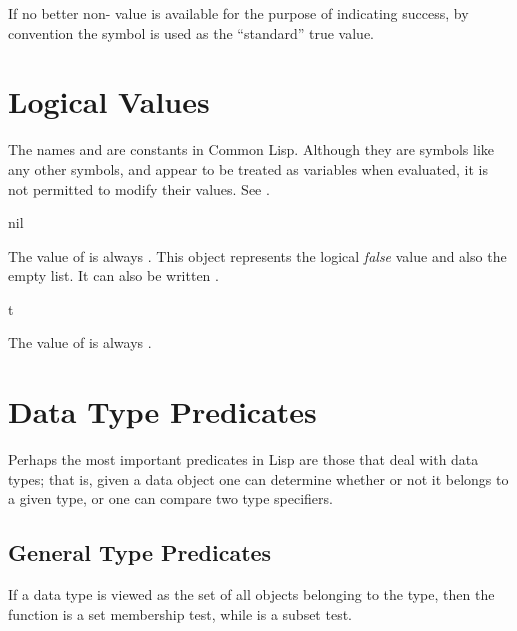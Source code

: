 If no better non-{\nil} value is available for the purpose of indicating
success, by convention the symbol  is used as the ``standard''
true value.

\section{Logical Values}

The names  and  are constants in Common Lisp.  Although they
are symbols like any other symbols, and appear to be treated
as variables when evaluated, it is not permitted to modify their
values.  See .

\begin{defun}[Constant]
nil

The value of {\nil} is always {\nil}.  This object represents the logical
\emph{false} value and also the empty list.  It can also be written \cd{()}.
\end{defun}

\begin{defun}[Constant]
t

The value of  is always .
\end{defun}

\section{Data Type Predicates}

Perhaps the most important predicates in Lisp are those that deal
with data types;  that is, given a data object one can determine whether
or not it belongs to a given type, or one can compare two type specifiers.

\subsection{General Type Predicates}

If a data type is viewed as the set of all objects belonging to the type,
then the  function is a set membership test, while 
is a subset test.

